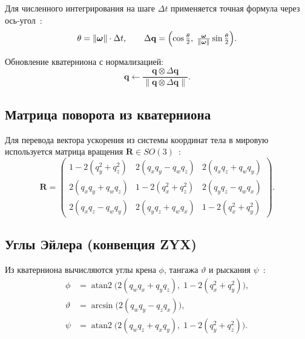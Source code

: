 \documentclass[../main.tex]{subfiles}
\begin{document}
Для численного интегрирования на шаге $\Delta t$ применяется точная формула
через ось-угол~\cite{titterton2004}:
\begin{equation}
    \theta = \|\bm{\omega}\| \cdot \Delta t, \qquad
    \Delta\mathbf{q} = \Bigl(\cos\tfrac{\theta}{2},\;
    \tfrac{\bm{\omega}}{\|\bm{\omega}\|}\sin\tfrac{\theta}{2}\Bigr).
    \label{eq:dq}
\end{equation}
 
Обновление кватерниона с нормализацией:
\begin{equation}
    \mathbf{q} \leftarrow \frac{\mathbf{q} \otimes \Delta\mathbf{q}}
    {\|\mathbf{q} \otimes \Delta\mathbf{q}\|}.
    \label{eq:qupdate}
\end{equation}
 
\subsection{Матрица поворота из кватерниона}
 
Для перевода вектора ускорения из системы координат тела в мировую используется
матрица вращения $\mathbf{R} \in SO(3)$~\cite{kuipers1999}:
\begin{equation}
    \mathbf{R} =
    \begin{pmatrix}
        1{-}2(q_y^2{+}q_z^2) & 2(q_xq_y{-}q_wq_z) & 2(q_xq_z{+}q_wq_y) \\
        2(q_xq_y{+}q_wq_z) & 1{-}2(q_x^2{+}q_z^2) & 2(q_yq_z{-}q_wq_x) \\
        2(q_xq_z{-}q_wq_y) & 2(q_yq_z{+}q_wq_x) & 1{-}2(q_x^2{+}q_y^2)
    \end{pmatrix}.
    \label{eq:rot}
\end{equation}
 
\subsection{Углы Эйлера (конвенция ZYX)}
 
Из кватерниона вычисляются углы крена $\phi$, тангажа $\vartheta$ и рыскания
$\psi$~\cite{titterton2004}:
\begin{align}
    \phi      &= \operatorname{atan2}\!\bigl(2(q_wq_x+q_yq_z),\;
                  1-2(q_x^2+q_y^2)\bigr), \label{eq:roll}\\
    \vartheta &= \arcsin\!\bigl(2(q_wq_y-q_zq_x)\bigr), \label{eq:pitch}\\
    \psi      &= \operatorname{atan2}\!\bigl(2(q_wq_z+q_xq_y),\;
                  1-2(q_y^2+q_z^2)\bigr). \label{eq:yaw}
\end{align}
 
\end{document}

